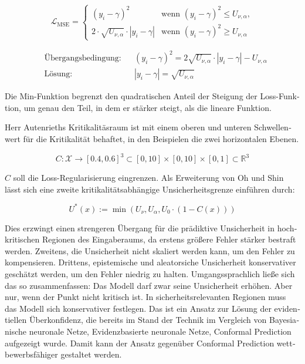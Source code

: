 \begin{otherlanguage}{ngerman}
\begin{equation}
\mathcal{L}_{\mathrm{MSE}} = 
\begin{cases}
  (y_i - \gamma)^2 & \text{wenn } (y_i - \gamma)^2 \le U_{\nu,\alpha}, \\
  2 \cdot \sqrt{U_{\nu, \alpha}} \cdot | y_i - \gamma | & \text{wenn } (y_i - \gamma)^2 \geq U_{\nu,\alpha}
\end{cases}
\end{equation}

\noindent
\begin{minipage}{\linewidth}
\begin{align*}
&\text{Übergangsbedingung:} && (y_i - \gamma)^2 = 2 \sqrt{U_{\nu,\alpha}} \cdot |y_i - \gamma| - U_{\nu,\alpha} \\
&\text{Lösung:} && |y_i - \gamma| = \sqrt{U_{\nu,\alpha}}
\end{align*}
\vspace{0.125\baselineskip}
\noindent
\end{minipage}

Die Min-Funktion begrenzt den quadratischen Anteil der Steigung der Loss-Funktion, um genau den Teil, in dem er stärker steigt, als die lineare Funktion. 

Herr Autenrieths Kritikalitäsraum ist mit einem oberen und unteren Schwellenwert für die Kritikalität behaftet, in den Beispielen die zwei horizontalen Ebenen.

\[
C \colon \mathcal{X} \rightarrow [0.4, 0.6]^3 \subset [0,10] \times [0,10] \times [0,1] \subset \mathbb{R}^3
\]

$C$ soll die Loss-Regularisierung eingrenzen. Als Erweiterung von Oh und Shin lässt sich eine zweite kritikalitätsabhängige Unsicherheitsgrenze einführen durch:

\[
U^*(x) := \min \left( U_\nu, U_\alpha, U_0 \cdot (1 - C(x)) \right)
\]

Dies erzwingt einen strengeren Übergang für die prädiktive Unsicherheit in hochkritischen Regionen des Eingaberaums, da erstens größere Fehler stärker bestraft werden. Zweitens, die Unsicherheit nicht skaliert werden kann, um den Fehler zu kompensieren. Drittens, epistemische und aleatorsiche Unsicherheit konservativer geschätzt werden, um den Fehler niedrig zu halten. Umgangssprachlich ließe sich das so zusammenfassen: Das Modell darf zwar seine Unsicherheit erhöhen. Aber nur, wenn der Punkt nicht kritisch ist. In sicherheitsrelevanten Regionen muss das Modell sich konservativer festlegen. Das ist ein Ansatz zur Lösung der evidentiellen Überkonfidenz, die bereits im Stand der Technik im Vergleich von \gls{Bayesianische neuronale Netze}, \gls{Evidenzbasierte neuronale Netze}, \gls{Conformal Prediction} aufgezeigt wurde. Damit kann der Ansatz gegenüber \gls{Conformal Prediction} wettbewerbsfähiger gestaltet werden.


\end{otherlanguage}
